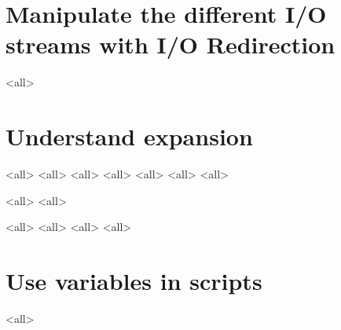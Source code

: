 \section{Manipulate the different I/O streams  with I/O Redirection}
\mode<all>{}


\section{Understand expansion}
\mode<all>{}
\mode<all>{}
\mode<all>{}
\mode<all>{}
\mode<all>{}
\mode<all>{}
\mode<all>{}

\mode<all>{}
\mode<all>{}

\mode<all>{}
\mode<all>{}
\mode<all>{}
\mode<all>{}


\section{Use variables in scripts}

\mode<all>{}




